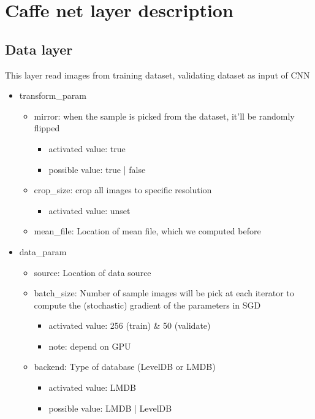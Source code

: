 \documentclass[11pt]{article}
\begin{document}
\section{Caffe net layer description}
\subsection{Data layer}
This layer read images from training dataset, validating dataset as input of CNN
\begin{itemize}
	\item transform\_param
	\begin{itemize}
		\item mirror: when the sample is picked from the dataset, it'll be randomly flipped 
			\begin{itemize}
				\item activated value: true
				\item possible value: true | false
			\end{itemize}
		\item crop\_size: crop all images to specific resolution
			\begin{itemize}
				\item activated value: unset
			\end{itemize}
		\item mean\_file: Location of mean file, which we computed before
	\end{itemize}
	\item data\_param
	\begin{itemize}
		\item source: Location of data source
		\item batch\_size: Number of sample images will be pick at each iterator to compute the (stochastic) gradient of the parameters in SGD
			\begin{itemize}
				\item activated value: 256 (train) \& 50 (validate)
				\item note: depend on GPU
			\end{itemize}
		\item backend: Type of database (LevelDB or LMDB)
			\begin{itemize}
				\item activated value: LMDB
				\item possible value: LMDB | LevelDB
			\end{itemize}
	\end{itemize}
\end{itemize}
\end{document}
